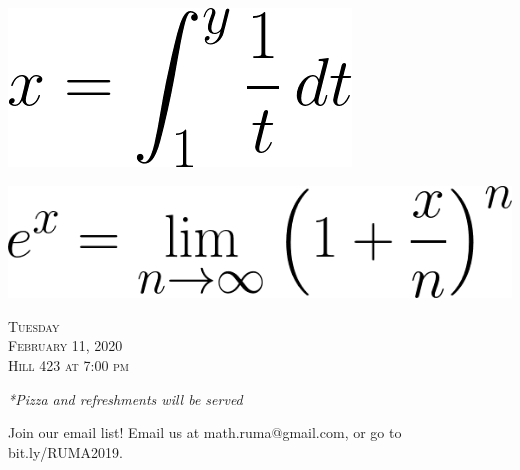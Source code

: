 \documentclass[12pt]{article}
\begin{document}
\begin{center}
\vspace{2mm} 
\includegraphics[scale=.45]{CodeCogsEqn(2).png}

\vspace{2mm} 
\includegraphics[scale=.45]{CodeCogsEqn(3).png}

\vspace{5mm} 
\Huge   \textsc{Tuesday\\February 11, 2020 \\Hill 423 at 7:00
  pm}

\vspace{2mm}
\large
\emph{*Pizza and refreshments will be served}
\end{center}

\begin{center}
  \large  Join our email list! Email us at math.ruma@gmail.com, or
go to bit.ly/RUMA2019.\\
\end{center}
\end{document}
